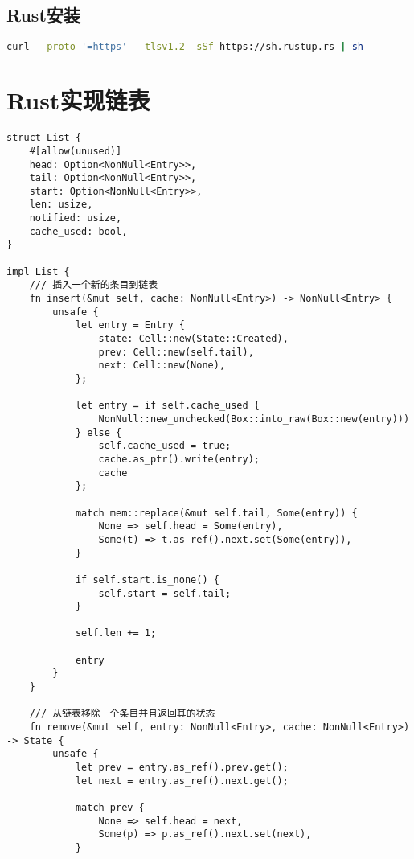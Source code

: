\subsection*{Rust安装}

\begin{lstlisting}[language=bash, caption = Rust安装]
curl --proto '=https' --tlsv1.2 -sSf https://sh.rustup.rs | sh
\end{lstlisting}


\section*{Rust实现链表}

\begin{lstlisting}
struct List {
    #[allow(unused)]
    head: Option<NonNull<Entry>>,
    tail: Option<NonNull<Entry>>,
    start: Option<NonNull<Entry>>,
    len: usize,
    notified: usize,
    cache_used: bool,
}

impl List {
    /// 插入一个新的条目到链表
    fn insert(&mut self, cache: NonNull<Entry>) -> NonNull<Entry> {
        unsafe {
            let entry = Entry {
                state: Cell::new(State::Created),
                prev: Cell::new(self.tail),
                next: Cell::new(None),
            };

            let entry = if self.cache_used {
                NonNull::new_unchecked(Box::into_raw(Box::new(entry)))
            } else {
                self.cache_used = true;
                cache.as_ptr().write(entry);
                cache
            };

            match mem::replace(&mut self.tail, Some(entry)) {
                None => self.head = Some(entry),
                Some(t) => t.as_ref().next.set(Some(entry)),
            }

            if self.start.is_none() {
                self.start = self.tail;
            }

            self.len += 1;

            entry
        }
    }

    /// 从链表移除一个条目并且返回其的状态
    fn remove(&mut self, entry: NonNull<Entry>, cache: NonNull<Entry>) -> State {
        unsafe {
            let prev = entry.as_ref().prev.get();
            let next = entry.as_ref().next.get();

            match prev {
                None => self.head = next,
                Some(p) => p.as_ref().next.set(next),
            }


\end{lstlisting}
